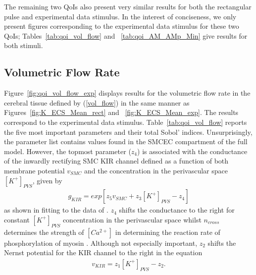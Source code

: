 The remaining two QoIs also present very similar results for both the rectangular pulse and experimental data stimulus. In the interest of conciseness, we only present figures corresponding to the experimental data stimulus for these two QoIs; Tables~\ref{tab:qoi_vol_flow} and ~\ref{tab:qoi_AM_AMp_Min} give results for both stimuli. 

\subsection{Volumetric Flow Rate}

Figure~\ref{fig:qoi_vol_flow_exp} displays results for the volumetric flow rate in the cerebral tissue defined by (\ref{vol_flow})  in the same manner as Figures~\ref{fig:K_ECS_Mean_rect} and ~\ref{fig:K_ECS_Mean_exp}. The results correspond to the experimental data stimulus.  Table~\ref{tab:qoi_vol_flow} reports the five most important parameters and their total Sobol' indices. Unsurprisingly, the parameter list contains values found in the SMCEC compartment of the full model. However, the topmost parameter ($z_4$) is associated with the conductance of the inwardly rectifying SMC KIR channel defined as a function of both membrane potential $v_{SMC}$ and the \pot concentration in the perivascular space $[K^+]_{PVS}$, given by 
\begin{eqnarray}
g_{KIR}=exp\left[ z_5 v_{SMC}+z_3[K^+]_{PVS}-z_4\right]  \label{eq:gkir}
\end{eqnarray}
as shown in \cite{Dormanns2015} fitting to the data of \cite{Filosa2006}. $z_4$ shifts the conductance to the right for constant $[K^+]_{PVS}$  concentration in the perivascular space whilst $n_{cross}$ determines the strength of $[Ca^{2+}]$ in determining the reaction rate of phosphorylation of myosin \cite{Hai1988}. Although not especially important, $z_2$ shifts the Nernst potential for the KIR channel to the right in the equation
\begin{eqnarray}
v_{KIR}=z_1 [K^+]_{PVS}-z_2. \label{vkir}
\end{eqnarray}

